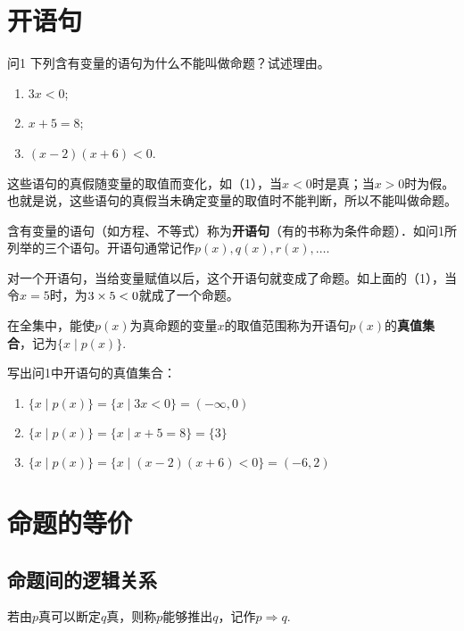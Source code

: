 \section*{开语句}
\begin{thm}{问1}
    下列含有变量的语句为什么不能叫做命题？试述理由。
\begin{enumerate}[(1)]
\item $3x<0$;
\item $x+5=8$;
\item $(x-2)(x+6)<0$.
\end{enumerate}

\end{thm}

\begin{analyze}
这些语句的真假随变量的取值而变化，如（1），当$x<0$时是真；当$x>0$时为假。也就是说，这些语句的真假当未确定变量的取值时不能判断，所以不能叫做命题。

含有变量的语句（如方程、不等式）称为\textbf{开语句}（有的书称为条件命题）．如问1所列举的三个语句。开语句通常记作$p(x),q(x),r(x),\ldots$.

对一个开语句，当给变量赋值以后，这个开语句就变成了命题。如上面的（1），当令$x=5$时，为$3\times5<0$就成了一个命题。

在全集中，能使$p(x)$为真命题的变量$x$的取值范围称为开语句$p(x)$的\textbf{真值集合}，记为$\{x\mid p(x)\}$.
\end{analyze}

\begin{example}
    写出问1中开语句的真值集合：
\end{example}

\begin{solution}
\begin{enumerate}[(1)]
    \item $\{x\mid p(x)\}=\{x\mid 3x<0\}=(-\infty,0)$
    \item $\{x\mid p(x)\}=\{x\mid x+5=8\}=\{3\}$
    \item $\{x\mid p(x)\}=\{x\mid (x-2)(x+6)<0\}=(-6,2)$
\end{enumerate}
\end{solution}

\section*{命题的等价}
\subsection*{命题间的逻辑关系}
若由$p$真可以断定$q$真，则称$p$能够推出$q$，记作$p\Rightarrow q$.

